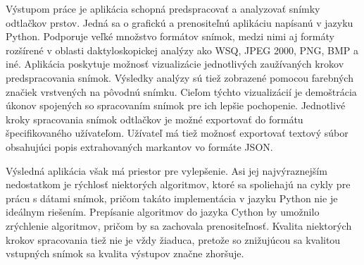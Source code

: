   Výstupom práce je aplikácia schopná predspracovať a analyzovať snímky odtlačkov prstov. Jedná sa o grafickú a prenositeľnú aplikáciu napísanú v jazyku
  Python. Podporuje veľké množstvo formátov snímok, medzi nimi aj formáty rozšírené v oblasti daktyloskopickej analýzy ako WSQ, JPEG 2000, PNG, BMP a iné.
  Aplikácia poskytuje možnosť vizualizácie jednotlivých zaužívaných krokov predspracovania snímok. Výsledky analýzy sú tiež zobrazené pomocou farebných
  značiek vrstvených na pôvodnú snímku. Cieľom týchto vizualizácií je demoštrácia úkonov spojených so spracovaním snímok pre ich lepšie pochopenie.
  Jednotlivé kroky spracovania snímok odtlačkov je možné exportovať do formátu špecifikovaného užívateľom.
  Užívateľ má tiež možnosť exportovať textový súbor obsahujúci popis extrahovaných markantov vo formáte JSON.

  Výsledná aplikácia však má priestor pre vylepšenie. Asi jej najvýraznejším nedostatkom je rýchlosť niektorých algoritmov, ktoré sa spoliehajú na
  cykly pre prácu s dátami snímok, pričom takáto implementácia v jazyku Python nie je ideálnym riešením. Prepísanie algoritmov do jazyka Cython by umožnilo
  zrýchlenie algoritmov, pričom by sa zachovala prenositeľnosť. Kvalita niektorých krokov spracovania tiež nie je vždy žiaduca, pretože so znižujúcou sa kvalitou
  vstupných snímok sa kvalita výstupov značne zhoršuje.

